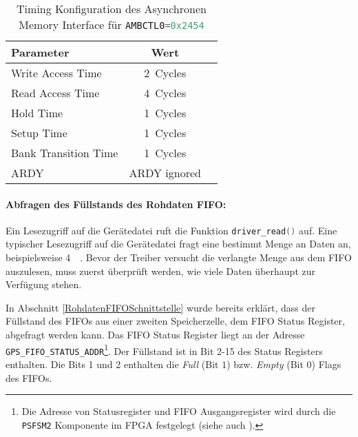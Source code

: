 \begin{table}[htbp]
    \ttabbox
    {
        \caption[EBIU Timing Konfiguration]{Timing Konfiguration des Asynchronen Memory Interface für \lstinline[language=C]$AMBCTL0=0x2454$}
        \label{TabEBIUTimingConfig}
    }
    {
    \begin{tabular}{l c c}
        \toprule
        Parameter               & Wert   \\
        \midrule
        Write Access Time       & \SI{2}{Cycles} \\
        Read Access Time        & \SI{4}{Cycles} \\
        Hold Time               & \SI{1}{Cycles} \\
        Setup Time              & \SI{1}{Cycles} \\
        Bank Transition Time    & \SI{1}{Cycles} \\
        ARDY                    & ARDY ignored \\
        \bottomrule
    \end{tabular}
}
\end{table}


\paragraph{Abfragen des Füllstands des Rohdaten FIFO:}
\label{FuellstandFIFO}
Ein Lesezugriff auf die Gerätedatei ruft die Funktion \lstinline[language=C]$driver_read()$ auf. Eine typischer Lesezugriff auf die Gerätedatei fragt eine bestimmt Menge an Daten an, beispielsweise \SI{4}{\kilo\byte}. Bevor der Treiber versucht die verlangte Menge aus dem FIFO auszulesen, muss zuerst überprüft werden, wie viele Daten überhaupt zur Verfügung stehen. 

In Abschnitt \ref{RohdatenFIFOSchnittstelle} wurde bereits erklärt, dass der Füllstand des FIFOs aus einer zweiten Speicherzelle, dem FIFO Status Register, abgefragt werden kann. Das FIFO Status Register liegt an der Adresse \lstinline$GPS_FIFO_STATUS_ADDR$\footnote{Die Adresse von Statusregister und FIFO Ausgangsregister wird durch die \lstinline$PSFSM2$ Komponente im FPGA festgelegt (siehe auch ).}. Der Füllstand ist in Bit 2-15 des Status Registers enthalten. Die Bits 1 und 2 enthalten die \emph{Full} (Bit $1$) bzw. \emph{Empty} (Bit $0$) Flags des FIFOs.

